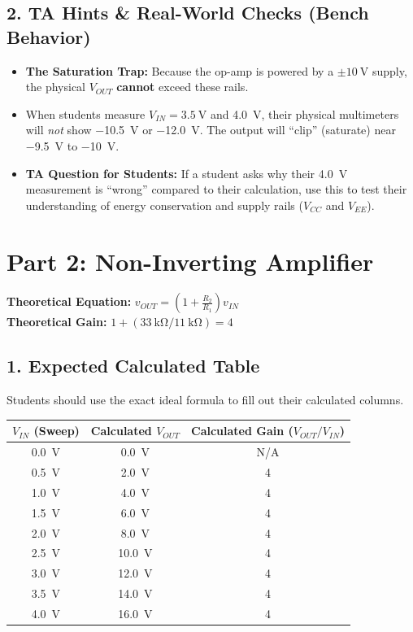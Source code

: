 \documentclass[11pt]{article}
\begin{document}
\subsection*{2. TA Hints \& Real-World Checks (Bench Behavior)}
\begin{itemize}
  \item \textbf{The Saturation Trap:} Because the op-amp is powered by a $\pm\SI{10}{\volt}$ supply, the physical $V_{OUT}$ \textbf{cannot} exceed these rails.
  \item When students measure $V_{IN} = \SI{3.5}{\volt}$ and \SI{4.0}{\volt}, their physical multimeters will \textit{not} show \SI{-10.5}{\volt} or \SI{-12.0}{\volt}. The output will ``clip'' (saturate) near \SI{-9.5}{\volt} to \SI{-10}{\volt}.
  \item \textbf{TA Question for Students:} If a student asks why their \SI{4.0}{\volt} measurement is ``wrong'' compared to their calculation, use this to test their understanding of energy conservation and supply rails ($V_{CC}$ and $V_{EE}$).
\end{itemize}

\newpage
\section*{Part 2: Non-Inverting Amplifier}

\textbf{Theoretical Equation:} $v_{OUT} = \left(1 + \frac{R_2}{R_1}\right) v_{IN}$ \\
\textbf{Theoretical Gain:} $1 + (\SI{33}{\kilo\ohm} / \SI{11}{\kilo\ohm}) = 4$

\subsection*{1. Expected Calculated Table}
Students should use the exact ideal formula to fill out their calculated columns.

\begin{table}[H]
  \centering
  \begin{tabular}{ccc}
    \toprule
    \textbf{$V_{IN}$ (Sweep)} & \textbf{Calculated $V_{OUT}$} & \textbf{Calculated Gain ($V_{OUT}/V_{IN}$)} \\
    \midrule
    \SI{0.0}{\volt} & \SI{0.0}{\volt} & N/A \\
    \SI{0.5}{\volt} & \SI{2.0}{\volt} & 4 \\
    \SI{1.0}{\volt} & \SI{4.0}{\volt} & 4 \\
    \SI{1.5}{\volt} & \SI{6.0}{\volt} & 4 \\
    \SI{2.0}{\volt} & \SI{8.0}{\volt} & 4 \\
    \SI{2.5}{\volt} & \SI{10.0}{\volt} & 4 \\
    \SI{3.0}{\volt} & \SI{12.0}{\volt} & 4 \\
    \SI{3.5}{\volt} & \SI{14.0}{\volt} & 4 \\
    \SI{4.0}{\volt} & \SI{16.0}{\volt} & 4 \\
    \bottomrule
  \end{tabular}
\end{table}
\end{document}
